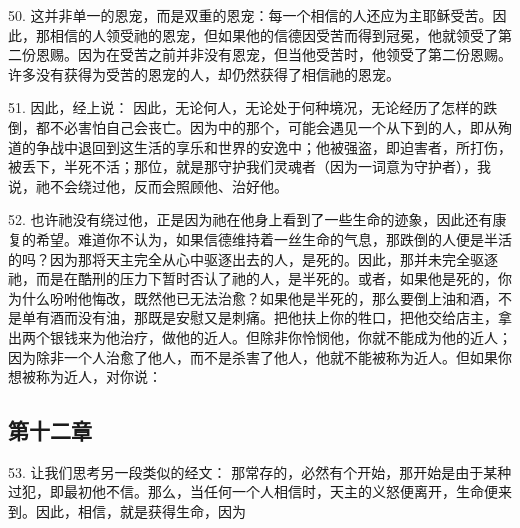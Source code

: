 50. 这并非单一的恩宠，而是双重的恩宠：每一个相信的人还应为主耶稣受苦。因此，那相信的人领受祂的恩宠，但如果他的信德因受苦而得到冠冕，他就领受了第二份恩赐。因为在受苦之前并非没有恩宠，但当他受苦时，他领受了第二份恩赐。许多没有获得为受苦的恩宠的人，却仍然获得了相信祂的恩宠。\par

51. 因此，经上说： 因此，无论何人，无论处于何种境况，无论经历了怎样的跌倒，都不必害怕自己会丧亡。因为中的那个，可能会遇见一个从下到的人，即从殉道的争战中退回到这生活的享乐和世界的安逸中；他被强盗，即迫害者，所打伤，被丢下，半死不活；那位，就是那守护我们灵魂者（因为一词意为守护者），我说，祂不会绕过他，反而会照顾他、治好他。\par

52. 也许祂没有绕过他，正是因为祂在他身上看到了一些生命的迹象，因此还有康复的希望。难道你不认为，如果信德维持着一丝生命的气息，那跌倒的人便是半活的吗？因为那将天主完全从心中驱逐出去的人，是死的。因此，那并未完全驱逐祂，而是在酷刑的压力下暂时否认了祂的人，是半死的。或者，如果他是死的，你为什么吩咐他悔改，既然他已无法治愈？如果他是半死的，那么要倒上油和酒，不是单有酒而没有油，那既是安慰又是刺痛。把他扶上你的牲口，把他交给店主，拿出两个银钱来为他治疗，做他的近人。但除非你怜悯他，你就不能成为他的近人；因为除非一个人治愈了他人，而不是杀害了他人，他就不能被称为近人。但如果你想被称为近人，对你说： \par


\subsection{第十二章}

\par

53. 让我们思考另一段类似的经文：  那常存的，必然有个开始，那开始是由于某种过犯，即最初他不信。那么，当任何一个人相信时，天主的义怒便离开，生命便来到。因此，相信，就是获得生命，因为 \par

